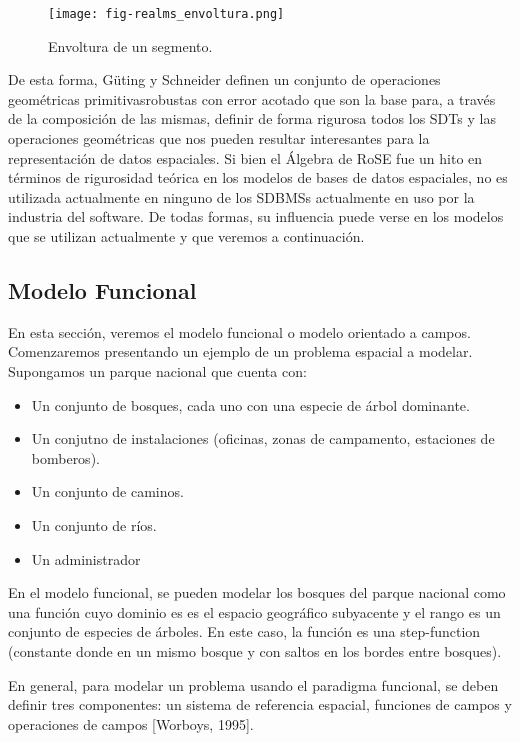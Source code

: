 \begin{figure}
    \centering
    \texttt{[image: fig-realms\_envoltura.png]}
    \caption{Envoltura de un segmento.}
    \label{fig:realms:envoltura}
\end{figure}

De esta forma, Güting y Schneider definen un conjunto de operaciones geométricas primitivasrobustas con error acotado que son la base para,
a través de la composición de las mismas, definir de forma rigurosa todos los SDTs
y las operaciones geométricas que nos pueden resultar interesantes para la representación de datos espaciales.
Si bien el Álgebra de RoSE fue un hito en términos de rigurosidad teórica en los modelos de bases de datos espaciales,
no es utilizada actualmente en ninguno de los SDBMSs actualmente en uso por la industria del software.
De todas formas, su influencia puede verse en los modelos que se utilizan actualmente y que veremos a continuación.

\subsection{Modelo Funcional}

En esta sección, veremos el modelo funcional o modelo orientado a campos. Comenzaremos presentando un ejemplo de un problema espacial a modelar. Supongamos un parque nacional que cuenta con:
\begin{itemize}
    \item Un conjunto de bosques, cada uno con una especie de árbol dominante.
    \item Un conjutno de instalaciones (oficinas, zonas de campamento, estaciones de bomberos).
    \item Un conjunto de caminos.
    \item Un conjunto de ríos.
    \item Un administrador
\end{itemize}

En el modelo funcional, se pueden modelar los bosques del parque nacional como una función cuyo dominio es es el espacio geográfico subyacente y el rango es un conjunto de especies de árboles. En este caso, la función es una step-function (constante donde en un mismo bosque y con saltos en los bordes entre bosques).

En general, para modelar un problema usando el paradigma funcional, se deben definir tres componentes: un sistema de referencia espacial, funciones de campos y operaciones de campos [Worboys, 1995].

